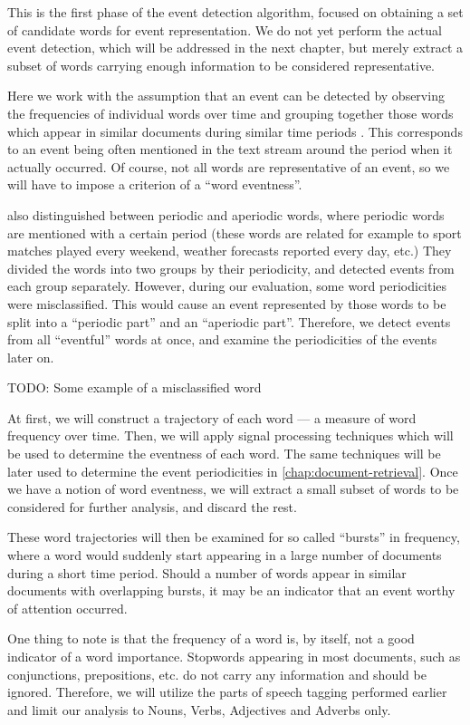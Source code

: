 This is the first phase of the event detection algorithm, focused on obtaining a set of candidate words for event representation. We do not yet perform the actual event detection, which will be addressed in the next chapter, but merely extract a subset of words carrying enough information to be considered representative.

Here we work with the assumption that an event can be detected by observing the frequencies of individual words over time and grouping together those words which appear in similar documents during similar time periods \cite{event-detection, parameter-free}. This corresponds to an event being often mentioned in the text stream around the period when it actually occurred. Of course, not all words are representative of an event, so we will have to impose a criterion of a ``word eventness''.

\cite{event-detection} also distinguished between periodic and aperiodic words, where periodic words are mentioned with a certain period (these words are related for example to sport matches played every weekend, weather forecasts reported every day, etc.) They divided the words into two groups by their periodicity, and detected events from each group separately. However, during our evaluation, some word periodicities were misclassified. This would cause an event represented by those words to be split into a ``periodic part'' and an ``aperiodic part''. Therefore, we detect events from all ``eventful'' words at once, and examine the periodicities of the events later on.

{\color{red} TODO: Some example of a misclassified word}

At first, we will construct a trajectory of each word --- a measure of word frequency over time. Then, we will apply signal processing techniques which will be used to determine the eventness of each word. The same techniques will be later used to determine the event periodicities in \autoref{chap:document-retrieval}. Once we have a notion of word eventness, we will extract a small subset of words to be considered for further analysis, and discard the rest.

These word trajectories will then be examined for so called ``bursts'' in frequency, where a word would suddenly start appearing in a large number of documents during a short time period. Should a number of words appear in similar documents with overlapping bursts, it may be an indicator that an event worthy of attention occurred.

One thing to note is that the frequency of a word is, by itself, not a good indicator of a word importance.
Stopwords appearing in most documents, such as conjunctions, prepositions, etc. do not carry any information and should be ignored. Therefore, we will utilize the parts of speech tagging performed earlier and limit our analysis to Nouns, Verbs, Adjectives and Adverbs only.

